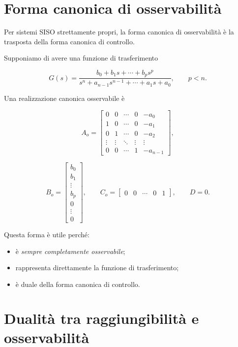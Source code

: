 \bigskip

\section{Forma canonica di osservabilità}

Per sistemi SISO strettamente propri, la forma canonica di osservabilità è la trasposta della forma canonica di controllo.

Supponiamo di avere una funzione di trasferimento

\[
G(s)=
\frac{b_0+b_1s+\cdots+b_ps^p}
{s^n+a_{n-1}s^{n-1}+\cdots+a_1s+a_0},
\qquad p<n.
\]

Una realizzazione canonica osservabile è

\[
A_o=
\begin{bmatrix}
0 & 0 & \cdots & 0 & -a_0\\
1 & 0 & \cdots & 0 & -a_1\\
0 & 1 & \cdots & 0 & -a_2\\
\vdots & \vdots & \ddots & \vdots & \vdots\\
0 & 0 & \cdots & 1 & -a_{n-1}
\end{bmatrix},
\]

\[
B_o=
\begin{bmatrix}
b_0\\
b_1\\
\vdots\\
b_p\\
0\\
\vdots\\
0
\end{bmatrix},
\qquad
C_o=
\begin{bmatrix}
0 & 0 & \cdots & 0 & 1
\end{bmatrix},
\qquad
D=0.
\]

\medskip

Questa forma è utile perché:
\begin{itemize}
    \item è \emph{sempre completamente osservabile};
    \item rappresenta direttamente la funzione di trasferimento;
    \item è duale della forma canonica di controllo.
\end{itemize}

\section{Dualità tra raggiungibilità e osservabilità}

